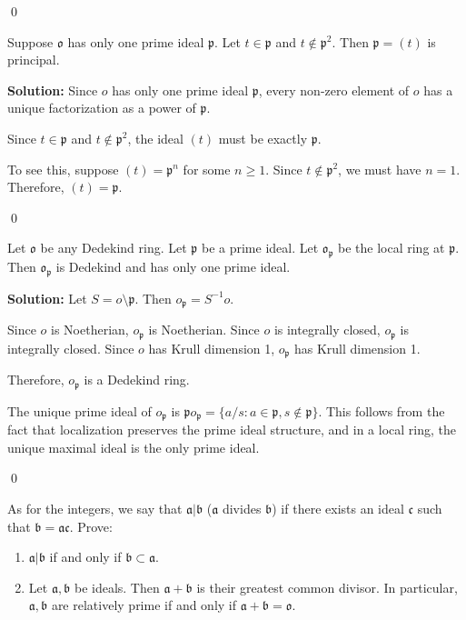 \qed
\begin{problembox}
Suppose $\mathfrak{o}$ has only one prime ideal $\mathfrak{p}$. Let $t \in \mathfrak{p}$ and $t \notin \mathfrak{p}^2$. Then $\mathfrak{p} = (t)$ is principal.
\end{problembox}

\noindent\textbf{Solution:}
Since $o$ has only one prime ideal $\mathfrak{p}$, every non-zero element of $o$ has a unique factorization as a power of $\mathfrak{p}$.

Since $t \in \mathfrak{p}$ and $t \notin \mathfrak{p}^2$, the ideal $(t)$ must be exactly $\mathfrak{p}$.

To see this, suppose $(t) = \mathfrak{p}^n$ for some $n \geq 1$. Since $t \notin \mathfrak{p}^2$, we must have $n = 1$. Therefore, $(t) = \mathfrak{p}$.


\qed
\begin{problembox}
Let $\mathfrak{o}$ be any Dedekind ring. Let $\mathfrak{p}$ be a prime ideal. Let $\mathfrak{o}_{\mathfrak{p}}$ be the local ring at $\mathfrak{p}$. Then $\mathfrak{o}_{\mathfrak{p}}$ is Dedekind and has only one prime ideal.
\end{problembox}

\noindent\textbf{Solution:}
Let $S = o \setminus \mathfrak{p}$. Then $o_{\mathfrak{p}} = S^{-1}o$.

Since $o$ is Noetherian, $o_{\mathfrak{p}}$ is Noetherian. Since $o$ is integrally closed, $o_{\mathfrak{p}}$ is integrally closed. Since $o$ has Krull dimension 1, $o_{\mathfrak{p}}$ has Krull dimension 1.

Therefore, $o_{\mathfrak{p}}$ is a Dedekind ring.

The unique prime ideal of $o_{\mathfrak{p}}$ is $\mathfrak{p} o_{\mathfrak{p}} = \{a/s : a \in \mathfrak{p}, s \notin \mathfrak{p}\}$. This follows from the fact that localization preserves the prime ideal structure, and in a local ring, the unique maximal ideal is the only prime ideal.


\qed
\begin{problembox}
As for the integers, we say that $\mathfrak{a} | \mathfrak{b}$ ($\mathfrak{a}$ divides $\mathfrak{b}$) if there exists an ideal $\mathfrak{c}$ such that $\mathfrak{b} = \mathfrak{a}\mathfrak{c}$. Prove:
\begin{enumerate}[label=(\alph*)]
    \item $\mathfrak{a} | \mathfrak{b}$ if and only if $\mathfrak{b} \subset \mathfrak{a}$.
    \item Let $\mathfrak{a}, \mathfrak{b}$ be ideals. Then $\mathfrak{a} + \mathfrak{b}$ is their greatest common divisor. In particular, $\mathfrak{a}, \mathfrak{b}$ are relatively prime if and only if $\mathfrak{a} + \mathfrak{b} = \mathfrak{o}$.
\end{enumerate}
\end{problembox}


